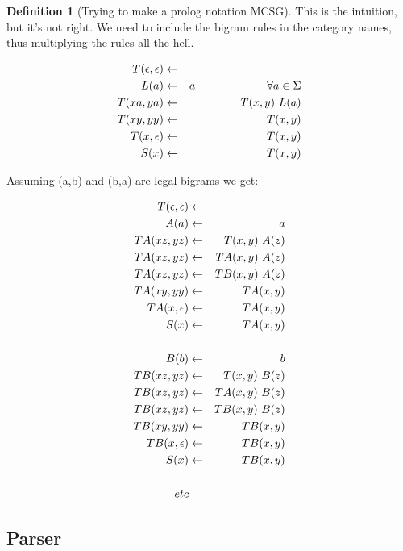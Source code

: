 \documentclass[12pt]{article}
\theoremstyle{definition}
\newtheorem{definition}{Definition}[section]
\begin{document}
\begin{definition}[Trying to make a prolog notation MCSG]
This is the intuition, but it's not right. We need to include the bigram rules in the category names, thus multiplying the rules all the hell.

  \begin{eqnarray*}
  T(\epsilon,\epsilon) &\leftarrow&\\ 
  L(a) &\leftarrow& a ~~~~~~~~~~~~~~~~~~~\forall a\in\Sigma\\
  T(xa,ya) &\leftarrow& T(x,y)~ L(a)  \\
  T(xy,yy) &\leftarrow& T(x,y)\\
  T(x,\epsilon) &\leftarrow& T(x,y)\\
  S(x) &\leftarrow& T(x,y)\\
  \end{eqnarray*}

Assuming (a,b) and (b,a) are legal bigrams we get:

  \begin{eqnarray*}
  T(\epsilon,\epsilon) &\leftarrow&\\ 
  A(a) &\leftarrow& a \\
  TA(xz,yz) &\leftarrow& T(x,y)~ A(z)  \\
  TA(xz,yz) &\leftarrow& TA(x,y)~ A(z)  \\
  TA(xz,yz) &\leftarrow& TB(x,y)~ A(z)  \\
  TA(xy,yy) &\leftarrow& TA(x,y)\\
  TA(x,\epsilon) &\leftarrow& TA(x,y)\\
  S(x) &\leftarrow& TA(x,y)\\
    \\
  B(b) &\leftarrow& b\\
  TB(xz,yz) &\leftarrow& T(x,y)~ B(z)  \\
  TB(xz,yz) &\leftarrow& TA(x,y)~ B(z)  \\
  TB(xz,yz) &\leftarrow& TB(x,y)~ B(z)  \\
  TB(xy,yy) &\leftarrow& TB(x,y)\\
  TB(x,\epsilon) &\leftarrow& TB(x,y)\\
  S(x) &\leftarrow& TB(x,y)\\
\\
etc\\
  \end{eqnarray*}



\end{definition}



\subsection{Parser}
\label{sec:parser}
\end{document}
